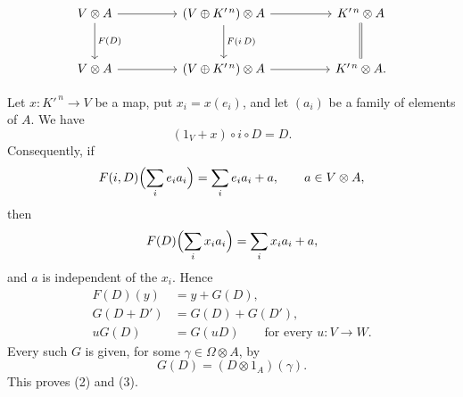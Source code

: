 \[
\begin{tikzcd}[column sep=huge,row sep=large]
 V\otimes A
   \arrow[r]
   \arrow[d,"{F(D)}"]
 & (V\oplus K'^{\,n})\otimes A
   \arrow[r]
   \arrow[d,"{F(i\,D)}"]
 & K'^{\,n}\otimes A
   \arrow[d,equal]\\
 V\otimes A
   \arrow[r]
 & (V\oplus K'^{\,n})\otimes A
   \arrow[r]
 & K'^{\,n}\otimes A.
\end{tikzcd}
\]

Let $x:K'^{\,n}\longrightarrow V$ be a map, put
$x_i=x(e_i)$, and let $(a_i)$ be a family of elements of $A$. We
have
\[
 (1_V+x)\circ i\circ D=D.
\]
Consequently, if
\[
 F(i,D)\Bigl(\sum_i e_i a_i\Bigr)
 =\sum_i e_i a_i+a,
 \qquad a\in V\otimes A,
\]
then
\[
 F(D)\Bigl(\sum_i x_i a_i\Bigr)
 =\sum_i x_i a_i+a,
\]
and $a$ is independent of the $x_i$. Hence
\[
\begin{aligned}
 F(D)(y)&=y+G(D),\\
 G(D+D')&=G(D)+G(D'),\\
 uG(D)&=G(uD)
   \qquad\text{for every }u:V\longrightarrow W.
\end{aligned}
\]
Every such $G$ is given, for some $\gamma\in\Omega\otimes A$, by
\[
 G(D)=(D\otimes1_A)(\gamma).
\]
This proves (2) and (3).
